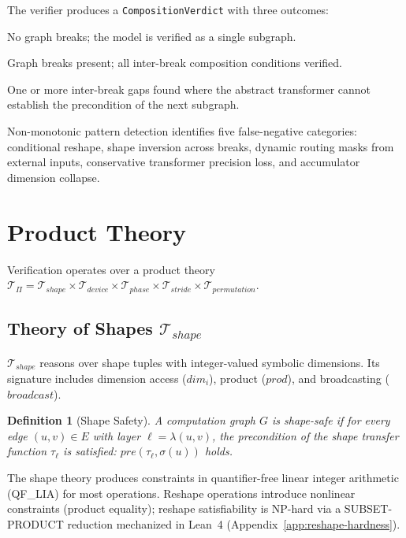 \documentclass[11pt]{article}
\newtheorem{definition}[theorem]{Definition}
\begin{document}
The verifier produces a \texttt{CompositionVerdict} with three outcomes:
\begin{description}[leftmargin=2em,nosep]
  \item[\textsc{Monolithic-Safe}:] No graph breaks; the model is
    verified as a single subgraph.
  \item[\textsc{Composition-Verified}:] Graph breaks present; all
    inter-break composition conditions verified.
  \item[\textsc{Gap-Detected}:] One or more inter-break gaps found
    where the abstract transformer cannot establish the precondition
    of the next subgraph.
\end{description}

\noindent
Non-monotonic pattern detection identifies five false-negative
categories: conditional reshape, shape inversion across breaks,
dynamic routing masks from external inputs, conservative transformer
precision loss, and accumulator dimension collapse.


\section{Product Theory}\label{sec:theory}

Verification operates over a product theory
$\mathcal{T}_\Pi = \mathcal{T}_{\mathit{shape}} \times
\mathcal{T}_{\mathit{device}} \times \mathcal{T}_{\mathit{phase}}
\times \mathcal{T}_{\mathit{stride}} \times \mathcal{T}_{\mathit{permutation}}$.

\subsection{Theory of Shapes $\mathcal{T}_{\mathit{shape}}$}

$\mathcal{T}_{\mathit{shape}}$ reasons over shape tuples with
integer-valued symbolic dimensions.  Its signature includes
dimension access ($\mathit{dim}_i$), product ($\mathit{prod}$),
and broadcasting ($\mathit{broadcast}$).

\begin{definition}[Shape Safety]
A computation graph $G$ is \emph{shape-safe} if for every edge
$(u,v) \in E$ with layer $\ell = \lambda(u,v)$, the precondition
of the shape transfer function $\tau_\ell$ is satisfied:
$\mathit{pre}(\tau_\ell, \sigma(u))$ holds.
\end{definition}

The shape theory produces constraints in quantifier-free linear
integer arithmetic (QF\_LIA) for most operations.  Reshape
operations introduce nonlinear constraints (product equality);
reshape satisfiability is NP-hard via a SUBSET-PRODUCT reduction
mechanized in Lean~4 (Appendix~\ref{app:reshape-hardness}).
\end{document}

